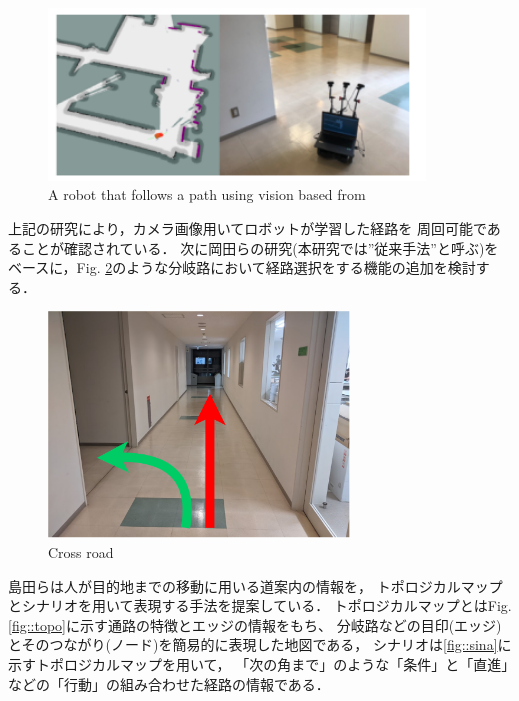 \begin{figure}[h]
    \centering
    \includegraphics[width = 10cm]{./figs/okada.png}
    \caption{A robot that follows a path using vision based from \cite{okada}}
    \label{fig::okada}
\end{figure}

\newpage
上記の研究により，カメラ画像用いてロボットが学習した経路を
周回可能であることが確認されている．
次に岡田ら\cite{okada}の研究(本研究では”従来手法”と呼ぶ)をベースに，Fig. \ref{fig::bunki}のような分岐路において経路選択をする機能の追加を検討する．
 \vspace{4.0zh}
\begin{figure}[h]
    \centering
    \includegraphics[width = 8cm]{./figs/bunki.pdf}
    \caption{Cross road}
    \label{fig::bunki}
\end{figure}
\newpage
島田ら\cite{simada}は人が目的地までの移動に用いる道案内の情報を，
トポロジカルマップとシナリオを用いて表現する手法を提案している．
トポロジカルマップとはFig. \ref{fig::topo}に示す通路の特徴とエッジの情報をもち、
分岐路などの目印(エッジ)とそのつながり(ノード)を簡易的に表現した地図である，
シナリオは\ref{fig::sina}に示すトポロジカルマップを用いて，
「次の角まで」のような「条件」と「直進」などの「行動」の組み合わせた経路の情報である．
